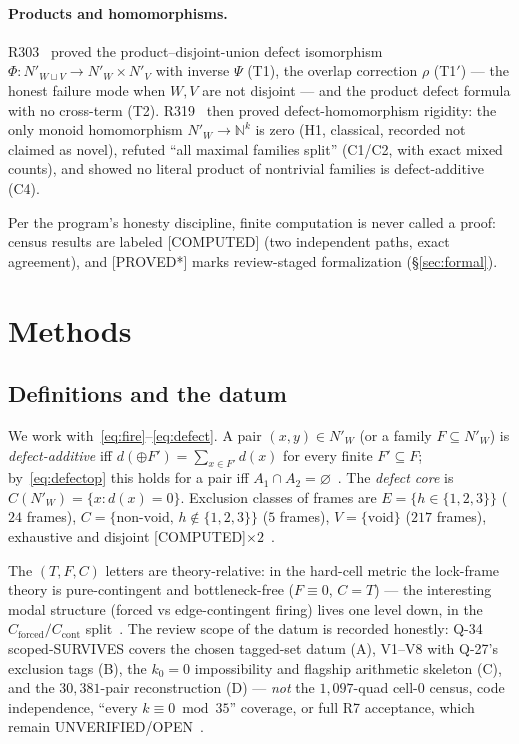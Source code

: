 \documentclass[11pt,a4paper]{article}
\theoremstyle{definition}
\begin{document}
\paragraph{Products and homomorphisms.} R303~\cite{D319} proved the
product–disjoint-union defect isomorphism
$\Phi:N'_{W\sqcup V}\to N'_W\times N'_V$ with inverse $\Psi$ (T1), the
overlap correction $\rho$ (T1$'$) — the honest failure mode when $W,V$
are not disjoint — and the product defect formula with no cross-term
(T2). R319~\cite{D319} then proved defect-homomorphism rigidity:
the only monoid homomorphism $N'_W\to\mathbb{N}^k$ is zero (H1,
classical, recorded not claimed as novel), refuted ``all maximal
families split'' (C1/C2, with exact mixed counts), and showed no literal
product of nontrivial families is defect-additive (C4).

Per the program's honesty discipline, finite computation is never called
a proof: census results are labeled [COMPUTED] (two independent paths,
exact agreement), and [PROVED*] marks review-staged formalization
(\S\ref{sec:formal}).

\section{Methods}

\subsection{Definitions and the datum}

We work with~\eqref{eq:fire}--\eqref{eq:defect}. A pair
$(x,y)\in N'_W$ (or a family $F\subseteq N'_W$) is
\emph{defect-additive} iff $d(\oplus F')=\sum_{x\in F'}d(x)$ for every
finite $F'\subseteq F$; by~\eqref{eq:defectop} this holds for a pair iff
$A_1\cap A_2=\varnothing$~\cite{D291}. The \emph{defect core} is
$C(N'_W)=\{x:d(x)=0\}$. Exclusion classes of frames are
$E=\{h\in\{1,2,3\}\}$ ($24$ frames), $C=\{\text{non-void},\,h\notin
\{1,2,3\}\}$ ($5$ frames), $V=\{\text{void}\}$ ($217$ frames),
exhaustive and disjoint [COMPUTED]$\times2$~\cite{D291}.

The $(T,F,C)$ letters are theory-relative: in the hard-cell metric the
lock-frame theory is pure-contingent and bottleneck-free ($F\equiv0$,
$C=T$) — the interesting modal structure (forced vs edge-contingent
firing) lives one level down, in the $C_{\mathrm{forced}}/C_{\mathrm{cont}}$
split~\cite{D289}. The review scope of the datum is recorded honestly:
Q-34 scoped-SURVIVES covers the chosen tagged-set datum (A), V1--V8
with Q-27's exclusion tags (B), the $k_0=0$ impossibility and flagship
arithmetic skeleton (C), and the $30{,}381$-pair reconstruction (D) —
\emph{not} the $1{,}097$-quad cell-0 census, code independence,
``every $k\equiv0\bmod35$'' coverage, or full R7 acceptance, which remain
UNVERIFIED/OPEN~\cite{D289,D314}.
\end{document}
